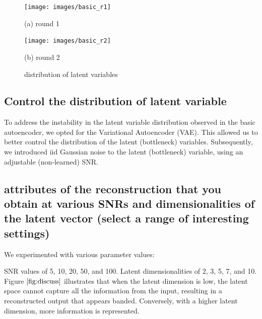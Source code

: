 \documentclass{article}
\begin{document}
\begin{figure}[htb]
  \begin{minipage}[b]{1.0\linewidth}
    \centering
    \centerline{\texttt{[image: images/basic\_r1]}}
    \centerline{(a) round 1}\medskip
  \end{minipage}
  \hfill
  \begin{minipage}[b]{1.0\linewidth}
    \centering
    \centerline{\texttt{[image: images/basic\_r2]}}
    \centerline{(b) round 2 }\medskip
  \end{minipage}
  \caption{distribution of latent variables}
  \label{fig:basic}
  \end{figure}

\subsection{Control the distribution of latent variable}
\label{ssec:VAE}

To address the instability in the latent variable distribution observed in the basic autoencoder, we opted for the Variational Autoencoder (VAE). This allowed us to better control the distribution of the latent (bottleneck) variables. Subsequently, we introduced iid Gaussian noise to the latent (bottleneck) variable, using an adjustable (non-learned) SNR.
\subsection{attributes of the reconstruction that you obtain at various SNRs and dimensionalities of the latent vector (select a range of interesting settings)}
\label{ssec:discuss}

We experimented with various parameter values:

SNR values of 5, 10, 20, 50, and 100.
Latent dimensionalities of 2, 3, 5, 7, and 10.
Figure $\ref{fig:discuss}$ illustrates that when the latent dimension is low, the latent space cannot capture all the information from the input, resulting in a reconstructed output that appears banded. Conversely, with a higher latent dimension, more information is represented.
\end{document}
